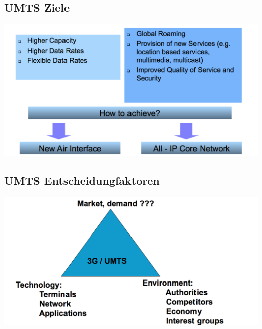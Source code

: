 \begin{minipage}{0.5\linewidth}
\subsection{UMTS Ziele}
\includegraphics[width = \linewidth]{./Pics/UMTS}
\end{minipage}
\begin{minipage}{0.5\linewidth}
\subsection{UMTS Entscheidungfaktoren}
\includegraphics[width = \linewidth]{./Pics/UMTS3}
\end{minipage}


